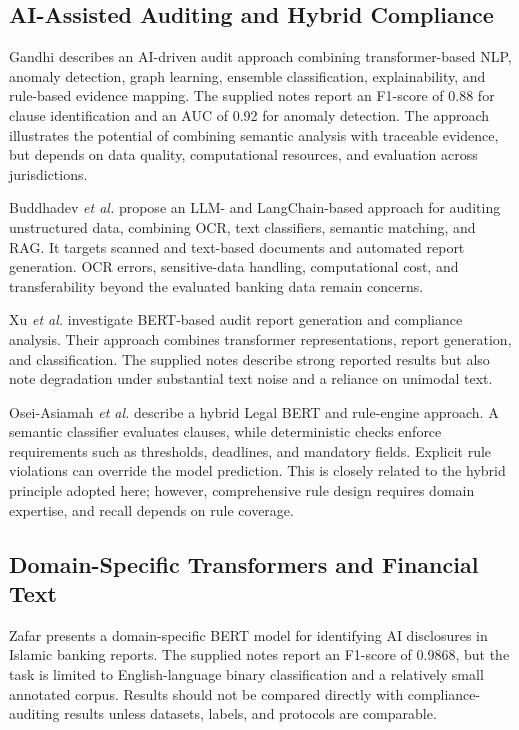 \documentclass[conference]{IEEEtran}
\begin{document}
\subsection{AI-Assisted Auditing and Hybrid Compliance}
Gandhi \cite{gandhi2023} describes an AI-driven audit approach combining transformer-based NLP, anomaly detection, graph learning, ensemble classification, explainability, and rule-based evidence mapping. The supplied notes report an F1-score of 0.88 for clause identification and an AUC of 0.92 for anomaly detection. The approach illustrates the potential of combining semantic analysis with traceable evidence, but depends on data quality, computational resources, and evaluation across jurisdictions.

Buddhadev \emph{et al.} \cite{buddhadev2025} propose an LLM- and LangChain-based approach for auditing unstructured data, combining OCR, text classifiers, semantic matching, and RAG. It targets scanned and text-based documents and automated report generation. OCR errors, sensitive-data handling, computational cost, and transferability beyond the evaluated banking data remain concerns.

Xu \emph{et al.} \cite{xu2025} investigate BERT-based audit report generation and compliance analysis. Their approach combines transformer representations, report generation, and classification. The supplied notes describe strong reported results but also note degradation under substantial text noise and a reliance on unimodal text.

Osei-Asiamah \emph{et al.} \cite{oseiasiamah2025} describe a hybrid Legal BERT and rule-engine approach. A semantic classifier evaluates clauses, while deterministic checks enforce requirements such as thresholds, deadlines, and mandatory fields. Explicit rule violations can override the model prediction. This is closely related to the hybrid principle adopted here; however, comprehensive rule design requires domain expertise, and recall depends on rule coverage.

\subsection{Domain-Specific Transformers and Financial Text}
Zafar \cite{zafar2026} presents a domain-specific BERT model for identifying AI disclosures in Islamic banking reports. The supplied notes report an F1-score of 0.9868, but the task is limited to English-language binary classification and a relatively small annotated corpus. Results should not be compared directly with compliance-auditing results unless datasets, labels, and protocols are comparable.
\end{document}
